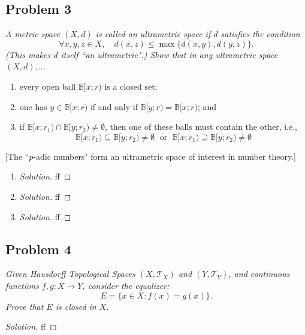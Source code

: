 \documentclass{article}
\begin{document}
\subsection*{Problem 3}
{\it A metric space $(X,d)$ is called an \emph{ultrametric space} if $d$ satisfies the condition
\[
	\forall x,y,z \in X, \quad d(x,z) \leq \max\{d(x,y),d(y,z)\}.
\]
(This makes $d$ itself ``an ultrametric".) Show that in any ultrametric space $(X,d)$,...
\begin{enumerate}
	\item every open ball $\mathbb{B}[x;r)$ is a closed set;
	\item one has $y \in \mathbb{B}[x;r)$ if and only if $\mathbb{B}[y;r) = \mathbb{B}[x;r)$; and
	\item if $\mathbb{B}[x;r_1) \cap \mathbb{B}[y;r_2) \neq \emptyset$,
		then one of these balls must contain the other, i.e.,
		\[
			\mathbb{B}[x;r_1) \subseteq \mathbb{B}[y;r_2) \neq \emptyset
			\; \text{ or }\;
			\mathbb{B}[x;r_1) \supseteq \mathbb{B}[y;r_2) \neq \emptyset
		\]
\end{enumerate}
[The ``$p$-adic numbers" form an ultrametric space of interest in number theory.]}

\begin{enumerate}
	\item \begin{proof}[Solution]\let\qed\relax
		ff
	\end{proof}
	\item \begin{proof}[Solution]\let\qed\relax
		ff
	\end{proof}
	\item \begin{proof}[Solution]\let\qed\relax
		ff
	\end{proof}
\end{enumerate}
\clearpage

\subsection*{Problem 4}
{\it Given Hausdorff Topological Spaces $(X,\mathcal{T}_X)$ and $(Y,\mathcal{T}_Y)$,
and continuous functions $f,g \colon X \to Y$, consider the \emph{equalizer}:
\[
	E = \{x \in X \colon f(x) = g(x)\}.
\]
Prove that $E$ is closed in $X$.}

\begin{proof}[Solution]\let\qed\relax
	ff
\end{proof}
\clearpage
~\clearpage
\end{document}

